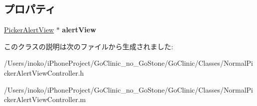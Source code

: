 \subsection*{プロパティ}
\begin{DoxyCompactItemize}
\item 
\hypertarget{interface_normal_picker_alert_view_controller_a28fb54c284c037119fbe9fdea9cb51b6}{
\hyperlink{interface_picker_alert_view}{PickerAlertView} $\ast$ {\bfseries alertView}}
\label{interface_normal_picker_alert_view_controller_a28fb54c284c037119fbe9fdea9cb51b6}

\end{DoxyCompactItemize}


このクラスの説明は次のファイルから生成されました:\begin{DoxyCompactItemize}
\item 
/Users/inoko/iPhoneProject/GoClinic\_\-no\_\-GoStone/GoClinic/Classes/NormalPickerAlertViewController.h\item 
/Users/inoko/iPhoneProject/GoClinic\_\-no\_\-GoStone/GoClinic/Classes/NormalPickerAlertViewController.m\end{DoxyCompactItemize}

